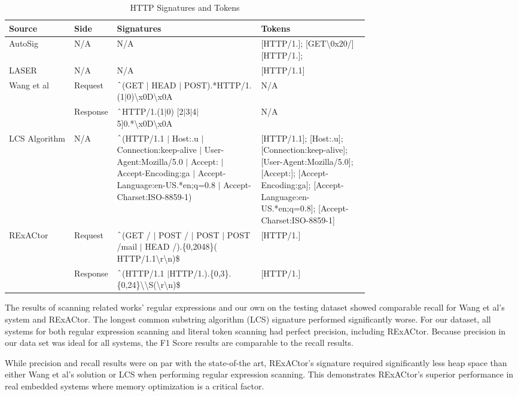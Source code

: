\begin{table*}[t]
  \centering
  \begin{tabular}{|l|l|p{0.4\linewidth}|p{0.3\linewidth}|}
 \hline
 Source & Side & Signatures & Tokens \\ [0.5ex]
 \hline\hline
 AutoSig \cite{AutoSig} & N/A & N/A & [HTTP/1.]; [GET\textbackslash0x20/] [HTTP/1.];\\
 \hline
 LASER \cite{LASER} & N/A & N/A & [HTTP/1.1] \\
 \hline
 Wang et al \cite{WANG2012992} & Request & $\string^$(GET $\vert$ HEAD $\vert$ POST).*HTTP/1.(1$\vert$0)\textbackslash x0D\textbackslash x0A & N/A\\
 \cline{2-4}
  & Response & $\string^$HTTP/1.(1$\vert$0) [2$\vert$3$\vert$4$\vert$5]0.*\textbackslash x0D\textbackslash x0A & N/A \\
 \hline
 LCS Algorithm \cite{VinothGeorge2013EfficientRE} & N/A & $\string^$(HTTP/1.1 $\vert$ Host:.u $\vert$ Connection:keep-alive $\vert$ User-Agent:Mozilla/5.0 $\vert$ Accept: $\vert$ Accept-Encoding:ga $\vert$ Accept-Language:en-US.*en;q=0.8 $\vert$ Accept-Charset:ISO-8859-1)  & [HTTP/1.1]; [Host:.u]; [Connection:keep-alive]; [User-Agent:Mozilla/5.0]; [Accept:]; [Accept-Encoding:ga]; [Accept-Language:en-US.*en;q=0.8]; [Accept-Charset:ISO-8859-1]\\
 \hline
 RExACtor & Request & $\string^$(GET / $\vert$ POST / $\vert$ POST $\vert$ POST /mail $\vert$ HEAD /).\{0,2048\}( HTTP/1.1\textbackslash r\textbackslash n)\$ & [HTTP/1.]\\
 \cline{2-4}
 & Response & $\string^$(HTTP/1.1 $\vert$HTTP/1.).\{0,3\}.\{0,24\}\textbackslash\textbackslash S(\textbackslash r\textbackslash n)\$ & [HTTP/1.] \\ [1ex]
 \hline
  \end{tabular}
  \caption{HTTP Signatures and Tokens}
  \label{table:http}
\end{table*}

The results of scanning related works' regular expressions and our own on the testing dataset showed comparable recall for Wang et al's system and RExACtor. The longest common substring algorithm (LCS) signature performed significantly worse. For our dataset, all systems for both regular expression scanning and literal token scanning had perfect precision, including RExACtor. Because precision in our data set was ideal for all systems, the F1 Score results are comparable to the recall results.

While precision and recall results were on par with the state-of-the art, RExACtor's signature required significantly less heap space than either Wang et al's solution or LCS when performing regular expression scanning. This demonstrates RExACtor's superior performance in real embedded systems where memory optimization is a critical factor.

